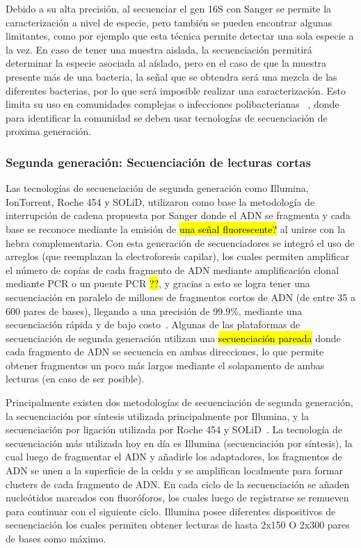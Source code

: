 Debido a su alta precisión, al secuenciar el gen 16S con Sanger se permite la caracterización a nivel de especie, pero también se pueden encontrar algunas limitantes, como por ejemplo que esta técnica permite detectar una sola especie a la vez. En caso de tener una muestra aislada, la secuenciación permitirá determinar la especie asociada al aíslado, pero en el caso de que la muestra presente más de una bacteria, la señal que se obtendra será una mezcla de las diferentes bacterias, por lo que será imposible realizar una caracterización. Esto limita su uso en comunidades complejas o infecciones polibacterianas ~\cite{lamoureux2022prospective}, donde para identificar la comunidad se deben usar tecnologías de secuenciación de proxima generación.
\subsubsection{Segunda generación: Secuenciación de lecturas cortas}
Las tecnologías de secuenciación de segunda generación como Illumina, IonTorrent, Roche 454 y SOLiD,  utilizaron como base la metodología de interrupción de cadena propuesta por Sanger donde el ADN se fragmenta y cada base se reconoce mediante la emisión de \hl{una señal fluorescente?} al unirse con la hebra complementaria. Con esta generación de secuenciadores se integró el uso de arreglos (que reemplazan la electroforesis capilar), los cuales permiten amplificar el número de copías de cada fragmento de ADN mediante amplificación clonal mediante PCR o un puente PCR \hl{??}, y gracias a esto se logra tener una secuenciación en paralelo de millones de fragmentos cortos de ADN (de entre 35 a 600 pares de bases), llegando a una precisión de 99.9\%, mediante una secuenciación rápida y de bajo costo~\cite{kumar2024next}.
Algunas de las plataformas de secuenciación de segunda generación utilizan una \hl{secuenciación pareada} donde cada fragmento de ADN se secuencia en ambas direcciones,  lo que permite obtener fragmentos un poco más largos mediante el solapamento de ambas lecturas (en caso de ser posible). 


Principalmente existen dos metodologías de secuenciación de segunda generación, la secuenciación por síntesis utilizada principalmente por Illumina, y la secuenciación por ligación utilizada por Roche 454 y SOLiD~\cite{mardis2008next}.
La tecnología de secuenciación más utilizada hoy en día es Illumina (secuenciación por síntesis), la cual luego de fragmentar el ADN y añadirle los adaptadores, los fragmentos de ADN se unen a la superficie de la celda y se amplifican localmente para formar clusters de cada fragmento de ADN. En cada ciclo de la secuenciación se añaden nucleótidos marcados con fluoróforos, los cuales luego de registrarse se remueven para continuar con el siguiente ciclo. 
Illumina posee diferentes dispositivos de secuenciación los cuales permiten obtener lecturas de hasta 2x150 O 2x300 pares de bases como máximo.


